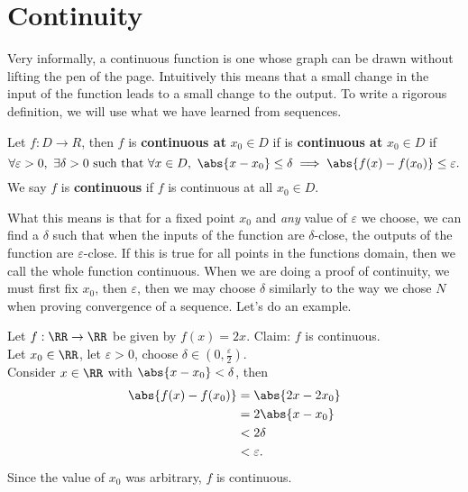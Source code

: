 \documentclass[../real_analysis.tex]{subfiles}
\begin{document}
    \section{Continuity}\label{sec:continuity}
        Very informally, a continuous function is one whose graph can be drawn without lifting the pen of the page. Intuitively this means that a small change in the input of the function leads to a small change to the output. To write a rigorous definition, we will use what we have learned from sequences.
        \begin{definition}
            Let $f: D \to R$, then $f$ is \textbf{continuous at} $x_0\in D$ if is \textbf{continuous at} $x_0\in D$ if
            \begin{equation}
                \forall\varepsilon>0,\ \exists\delta>0\text{ such that }\forall x\in D,\ \abs{x-x_0}\leq\delta\implies\abs{f(x)-f(x_0)}\leq\varepsilon.
            \end{equation}
            We say $f$ is \textbf{continuous} if $f$ is continuous at all $x_0\in D$.
        \end{definition}
        What this means is that for a fixed point $x_0$ and \textit{any} value of $\varepsilon$ we choose, we can find a $\delta$ such that when the inputs of the function are $\delta$-close, the outputs of the function are $\varepsilon$-close. If this is true for all points in the functions domain, then we call the whole function continuous.
        When we are doing a proof of continuity, we must first fix $x_0$, then $\varepsilon$, then we may choose $\delta$ similarly to the way we chose $N$ when proving convergence of a sequence. Let's do an example.
        \begin{example}
            Let $f: \RR\to\RR$ be given by $f(x)=2x$.
            Claim: $f$ is continuous.\\
            Let $x_0\in\RR$, let $\varepsilon>0$, choose $\delta\in(0,\frac{\varepsilon}{2})$.\\
            Consider $x\in\RR$ with $\abs{x-x_0}<\delta$, then
            \begin{align}
                \abs{f(x)-f(x_0)}&=\abs{2x-2x_0}\\
                &=2\abs{x-x_0}\\
                &<2\delta\\
                &<\varepsilon.
            \end{align}
            Since the value of $x_0$ was arbitrary, $f$ is continuous.
        \end{example}
        
\end{document}
